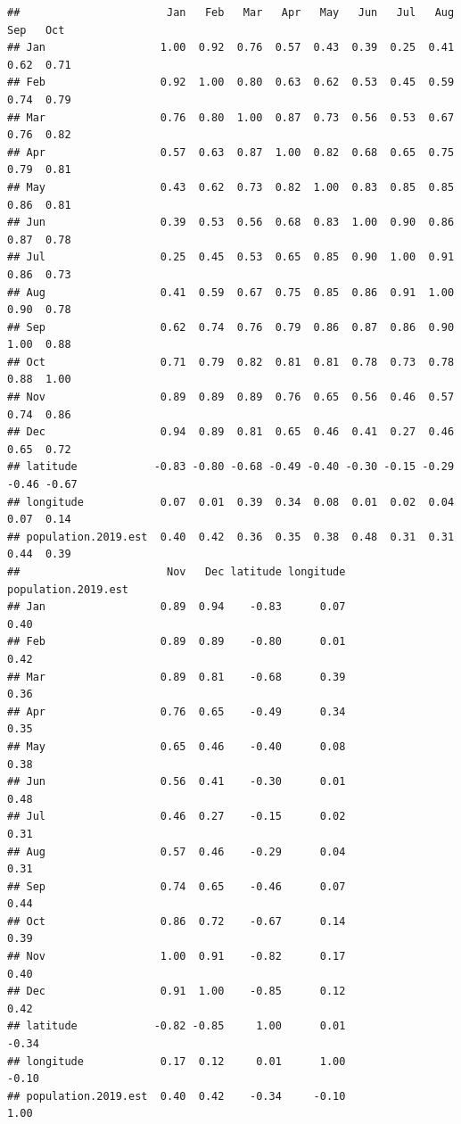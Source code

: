 \documentclass[
]{article}
\begin{document}
\begin{verbatim}
##                       Jan   Feb   Mar   Apr   May   Jun   Jul   Aug   Sep   Oct
## Jan                  1.00  0.92  0.76  0.57  0.43  0.39  0.25  0.41  0.62  0.71
## Feb                  0.92  1.00  0.80  0.63  0.62  0.53  0.45  0.59  0.74  0.79
## Mar                  0.76  0.80  1.00  0.87  0.73  0.56  0.53  0.67  0.76  0.82
## Apr                  0.57  0.63  0.87  1.00  0.82  0.68  0.65  0.75  0.79  0.81
## May                  0.43  0.62  0.73  0.82  1.00  0.83  0.85  0.85  0.86  0.81
## Jun                  0.39  0.53  0.56  0.68  0.83  1.00  0.90  0.86  0.87  0.78
## Jul                  0.25  0.45  0.53  0.65  0.85  0.90  1.00  0.91  0.86  0.73
## Aug                  0.41  0.59  0.67  0.75  0.85  0.86  0.91  1.00  0.90  0.78
## Sep                  0.62  0.74  0.76  0.79  0.86  0.87  0.86  0.90  1.00  0.88
## Oct                  0.71  0.79  0.82  0.81  0.81  0.78  0.73  0.78  0.88  1.00
## Nov                  0.89  0.89  0.89  0.76  0.65  0.56  0.46  0.57  0.74  0.86
## Dec                  0.94  0.89  0.81  0.65  0.46  0.41  0.27  0.46  0.65  0.72
## latitude            -0.83 -0.80 -0.68 -0.49 -0.40 -0.30 -0.15 -0.29 -0.46 -0.67
## longitude            0.07  0.01  0.39  0.34  0.08  0.01  0.02  0.04  0.07  0.14
## population.2019.est  0.40  0.42  0.36  0.35  0.38  0.48  0.31  0.31  0.44  0.39
##                       Nov   Dec latitude longitude population.2019.est
## Jan                  0.89  0.94    -0.83      0.07                0.40
## Feb                  0.89  0.89    -0.80      0.01                0.42
## Mar                  0.89  0.81    -0.68      0.39                0.36
## Apr                  0.76  0.65    -0.49      0.34                0.35
## May                  0.65  0.46    -0.40      0.08                0.38
## Jun                  0.56  0.41    -0.30      0.01                0.48
## Jul                  0.46  0.27    -0.15      0.02                0.31
## Aug                  0.57  0.46    -0.29      0.04                0.31
## Sep                  0.74  0.65    -0.46      0.07                0.44
## Oct                  0.86  0.72    -0.67      0.14                0.39
## Nov                  1.00  0.91    -0.82      0.17                0.40
## Dec                  0.91  1.00    -0.85      0.12                0.42
## latitude            -0.82 -0.85     1.00      0.01               -0.34
## longitude            0.17  0.12     0.01      1.00               -0.10
## population.2019.est  0.40  0.42    -0.34     -0.10                1.00
\end{verbatim}
\end{document}

